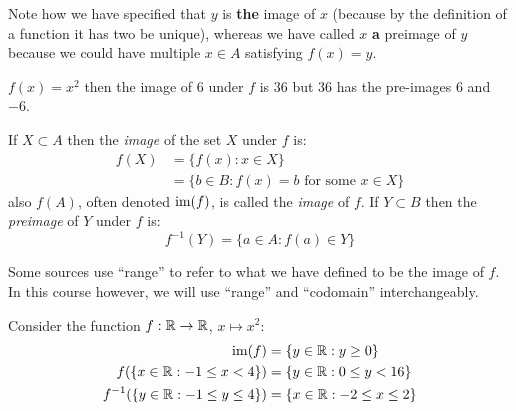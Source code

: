 \documentclass[../main.tex]{subfiles}
\begin{document}
\begin{remark}
  Note how we have specified that $y$ is \textbf{the} image of $x$ (because by the definition of a function it has two be unique), whereas we have called $x$ \textbf{a} preimage of $y$ because we could have multiple $x \in A$ satisfying  $f(x) = y$.
\end{remark}
\begin{example}
  $f(x) = x^2$ then the image of $6$ under $f$ is $36$ but $36$ has the pre-images $6$ and $-6$.
\end{example}
If $X \subset A$ then the \textit{image} of the set $X$ under $f$ is:
\begin{align*}
  f(X) &= \{f(x): x \in X\} \\
       &= \{b \in B: f(x) = b \text{ for some } x \in X\}
\end{align*}
also $f(A)$, often denoted $\operatorname{im}(f)$, is called the \textit{image} of $f$.
If $Y \subset B$ then the \textit{preimage} of $Y$ under $f$ is:
\[
  f^{-1}(Y) = \{a \in A: f(a) \in Y\}
\]
\begin{remark}
  Some sources use ``range'' to refer to what we have defined to be the image of $f$.
  In this course however, we will use ``range'' and ``codomain'' interchangeably.
\end{remark}
\begin{example}
  Consider the function $f: \mathbb{R} \to \mathbb{R}$, $x \mapsto x^2$:
  \begin{align*}
    \operatorname{im}(f) &= \{y \in \mathbb{R}: y\geq0\} \\
    f(\{x \in \mathbb{R}: -1 \leq x < 4\}) &= \{y \in \mathbb{R}: 0 \leq y < 16\} \\
    f^{-1}(\{y \in \mathbb{R}: -1 \leq y \leq 4\}) &= \{x \in \mathbb{R}: -2 \leq x \leq 2\}
  \end{align*}
\end{example}
\end{document}
